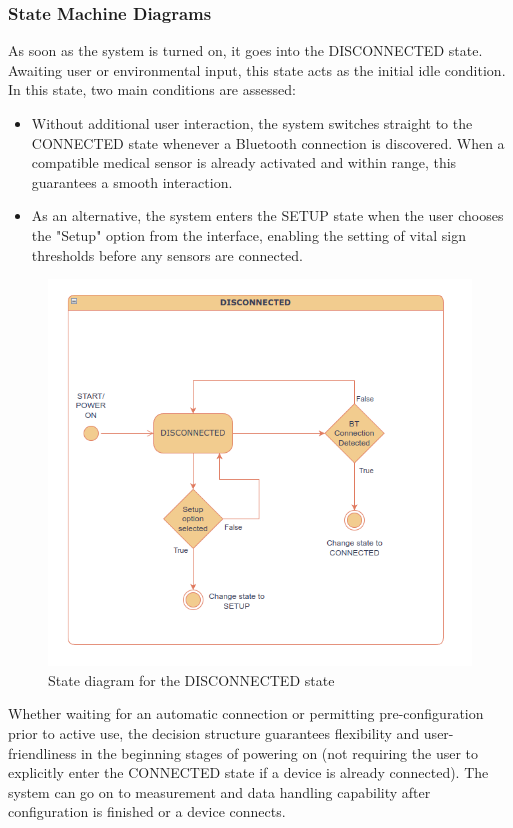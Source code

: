 \subsubsection{State Machine Diagrams}
As soon as the system is turned on, it goes into the DISCONNECTED state. Awaiting user or environmental input, this state acts as the initial idle condition. In this state, two main conditions are assessed:

\begin{itemize}
	\item Without additional user interaction, the system switches straight to the CONNECTED state whenever a Bluetooth connection is discovered. When a compatible medical sensor is already activated and within range, this guarantees a smooth interaction.
	\item As an alternative, the system enters the SETUP state when the user chooses the "Setup" option from the interface, enabling the setting of vital sign thresholds before any sensors are connected.
\end{itemize}

\begin{figure}[H]
	\centering
	\includegraphics[width=\textwidth]{diagrams/states_disconnected}
	\caption{State diagram for the DISCONNECTED state}
	\label{fig:states_disconnected}
\end{figure}

Whether waiting for an automatic connection or permitting pre-configuration prior to active use, the decision structure guarantees flexibility and user-friendliness in the beginning stages of powering on (not requiring the user to explicitly enter the CONNECTED state if a device is already connected). The system can go on to measurement and data handling capability after configuration is finished or a device connects.

